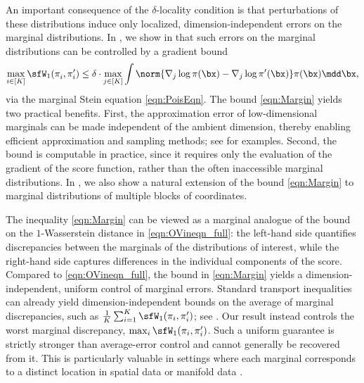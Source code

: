 \documentclass[11pt]{article}
\begin{document}
An important consequence of the $\delta$-locality condition is that perturbations of these distributions induce only localized, dimension-independent errors on the marginal distributions.
%
In , we show in  that such errors on the marginal distributions can be controlled by a gradient bound 
\begin{equation}
\label{eqn:Margin}
    \max_{i\in [K]} \sfW_1(\pi_i^{},\pi_i') \le \delta \cdot \max_{j\in[K]} \int \norm{ \nabla_j \log \pi (\bx) - \nabla_j \log \pi' (\bx) } \pi(\bx) \mdd \bx,
\end{equation}
via the marginal Stein equation \eqref{eqn:PoisEqn}.
%
The bound \eqref{eqn:Margin} yields two practical benefits.
%
First, the approximation error of low-dimensional marginals can be made independent of the ambient dimension, thereby enabling efficient approximation and sampling methods; see \cite{MR3901708,MR4111677,24M1694781,chen2026convergence,lacker2025hierarchical} for examples.
%
Second, the bound is computable in practice, since it requires only the evaluation of the gradient of the score function, rather than the often inaccessible marginal distributions.
%
In , we also show a natural extension of the bound \eqref{eqn:Margin} to marginal distributions of multiple blocks of coordinates.


\begin{rem}
The inequality \eqref{eqn:Margin} can be viewed as a marginal analogue of the bound on the $1$-Wasserstein distance in \eqref{eqn:OVineqn_full}: the left-hand side quantifies discrepancies between the marginals of the distributions of interest, while the right-hand side captures differences in the individual components of the score.
%
Compared to \eqref{eqn:OVineqn_full}, the bound in \eqref{eqn:Margin} yields a dimension-independent, uniform control of marginal errors.
Standard transport inequalities can already yield dimension-independent bounds on the average of marginal discrepancies, such as \(\frac{1}{K}\sum_{i=1}^K \sfW_1(\pi_i,\pi_i')\); see \cite{lacker2025hierarchical}. 
Our result instead controls the worst marginal discrepancy, $\max_i \sfW_1(\pi_i,\pi_i')$. Such a uniform guarantee is strictly stronger than average-error control and cannot generally be recovered from it.
This is particularly valuable in settings where each marginal corresponds to a distinct location in spatial data \cite{MR4580673} or manifold data \cite{10.3150/24-BEJ1804,khoo2024temporal}.
\end{rem}
\end{document}
